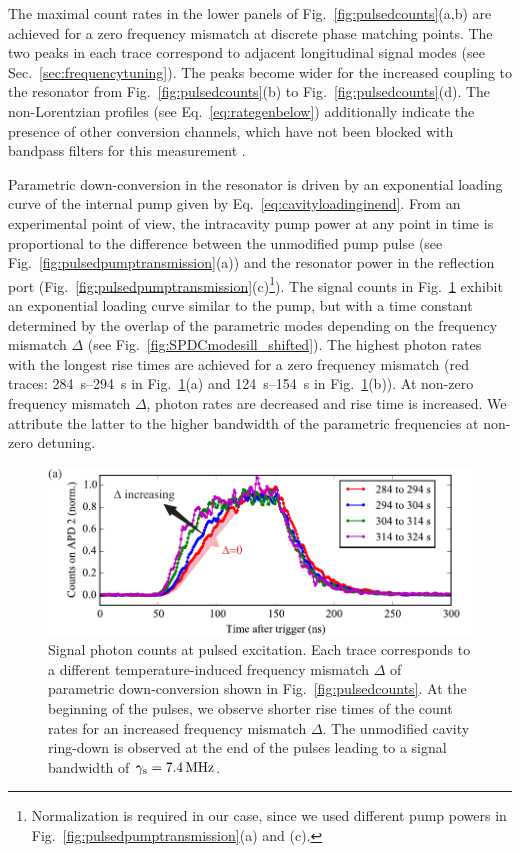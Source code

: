 \documentclass[aps,pra,showpacs,reprint,onecolumn,notitlepage]{revtex4-1}
\newcommand{\tx}[1]{\textnormal{#1}}
\begin{document}
The maximal count rates in the lower panels of Fig.~\ref{fig:pulsedcounts}(a,b) are achieved for a zero frequency mismatch at discrete phase matching points. The two peaks in each trace correspond to adjacent longitudinal signal modes (see Sec.~\ref{sec:frequencytuning}). The peaks become wider for the increased coupling to the resonator from Fig.~\ref{fig:pulsedcounts}(b) to Fig.~\ref{fig:pulsedcounts}(d). The non-Lorentzian profiles (see Eq.~\ref{eq:rategenbelow}) additionally indicate the presence of other conversion channels, which have not been blocked with bandpass filters for this measurement \cite{Michael2014}.

Parametric down-conversion in the resonator is driven by an exponential loading curve of the internal pump given by Eq.~\ref{eq:cavityloadinginend}. From an experimental point of view, the intracavity pump power at any point in time is proportional to the difference between the unmodified pump pulse (see Fig.~\ref{fig:pulsedpumptransmission}(a)) and the resonator power in the reflection port (Fig.~\ref{fig:pulsedpumptransmission}(c)\footnote{Normalization is required in our case, since we used different pump powers in Fig.~\ref{fig:pulsedpumptransmission}(a) and (c).}). The signal counts in Fig.~\ref{fig:pulsedcountsnano} exhibit an exponential loading curve similar to the pump, but with a time constant determined by the overlap of the parametric modes depending on the frequency mismatch $\Delta$ (see Fig.~\ref{fig:SPDCmodesill_shifted}). The highest photon rates with the longest rise times are achieved for a zero frequency mismatch (red traces: \SIrange[range-units = single]{284}{294}{\s} in Fig.~\ref{fig:pulsedcountsnano}(a) and \SIrange[range-units = single]{124}{154}{\s} in Fig.~\ref{fig:pulsedcountsnano}(b)). At non-zero frequency mismatch $\Delta$, photon rates are decreased and rise time is increased. We attribute the latter to the higher bandwidth of the parametric frequencies at non-zero detuning.
\begin{figure}[htb]
	\centering
	\includegraphics[scale=0.8]{pictures/exp_WGMR_detuning/SPDC_detuning_pulses_1.pdf} 
	\caption{Signal photon counts at pulsed excitation. Each trace corresponds to a different temperature-induced frequency mismatch $\Delta$ of parametric down-conversion shown in Fig.~\ref{fig:pulsedcounts}. At the beginning of the pulses, we observe shorter rise times of the count rates for an increased frequency mismatch $\Delta$. The unmodified cavity ring-down is observed at the end of the pulses leading to a signal bandwidth of ${\gamma_\tx{s}=\SI{7.4}{\MHz}}$.}
	\label{fig:pulsedcountsnano}
\end{figure}
\end{document}
